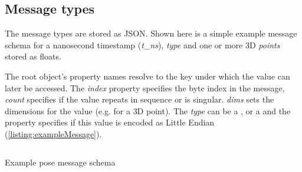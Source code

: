 \subsection{Message types}

The message types are stored as JSON. Shown here is a simple example message schema for a nanosecond timestamp (\emph{{t\_ns}}), \emph{type} and one or more \ac{3D} \emph{points} stored as floats.

The root object's property names resolve to the key under which the value can later be accessed. The \emph{index} property specifies the byte index in the message, \emph{count} specifies if the value repeats in sequence or is singular. \emph{dims} sets the dimensions for the value (e.g.  for a \ac{3D} point). The \emph{type} can be a ,  or a  and the property  specifies if this value is encoded as Little Endian (\autoref{listing:exampleMessage}).

\begin{listing}[!ht]
\inputminted{json}{04_Artefakte/03_Listings/example-pose-message.json}
\caption{Example pose message schema}
\label{listing:exampleMessage}
\end{listing}
